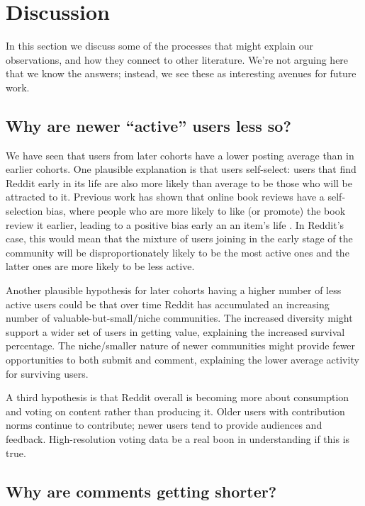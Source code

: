 
\section{Discussion}

In this section we discuss some of the processes that might explain our observations, and how they connect to other literature.  We're not arguing here that we know the answers; instead, we see these as interesting avenues for future work.  

\subsection{Why are newer ``active'' users less so?}

We have seen that users from later cohorts have a lower posting average than in earlier cohorts. 
One plausible explanation is that users self-select: users that find Reddit early in its life are also more likely than average to be those who will be attracted to it. Previous work has shown that online book reviews have a self-selection bias, where people who are more likely to like (or promote) the book review it earlier, leading to a positive bias early an an item's life \cite{Li2008}.  In Reddit's case, this would mean that the mixture of users joining in the early stage of the community will be disproportionately likely to be the most active ones and the latter ones are more likely to be less active. 

Another plausible hypothesis for later cohorts having a higher number of less active users could be that over time Reddit has accumulated an increasing number of valuable-but-small/niche communities.  The increased diversity might support a wider set of users in getting value, explaining the increased survival percentage.  The niche/smaller nature of newer communities might provide fewer opportunities to both submit and comment, explaining the lower average activity for surviving users. 

A third hypothesis is that Reddit overall is becoming more about consumption and voting on content rather than producing it.  Older users with contribution norms continue to contribute; newer users tend to provide audiences and feedback.  High-resolution voting data be a real boon in understanding if this is true.

\subsection{Why are comments getting shorter?}

